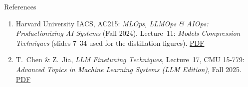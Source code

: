 \begin{frame}[allowframebreaks]{References}
\begin{enumerate}
    \item Harvard University IACS, AC215: \textit{MLOps, LLMOps \& AIOps: Productionizing AI Systems} (Fall 2024), Lecture~11: \textit{Models Compression Techniques} (slides 7--34 used for the distillation figures). \href{https://harvard-iacs.github.io/2024-AC215/assets/lectures/lecture11/L11_compression_techniques.pdf}{PDF}
    \item T.~Chen \& Z.~Jia, \textit{LLM Finetuning Techniques}, Lecture~17, CMU 15-779: \textit{Advanced Topics in Machine Learning Systems (LLM Edition)}, Fall 2025. \href{https://www.cs.cmu.edu/\%7Ezhihaoj2/15-779/slides/17-LLM-finetuning.pdf}{PDF}
  \end{enumerate}
\end{frame}
